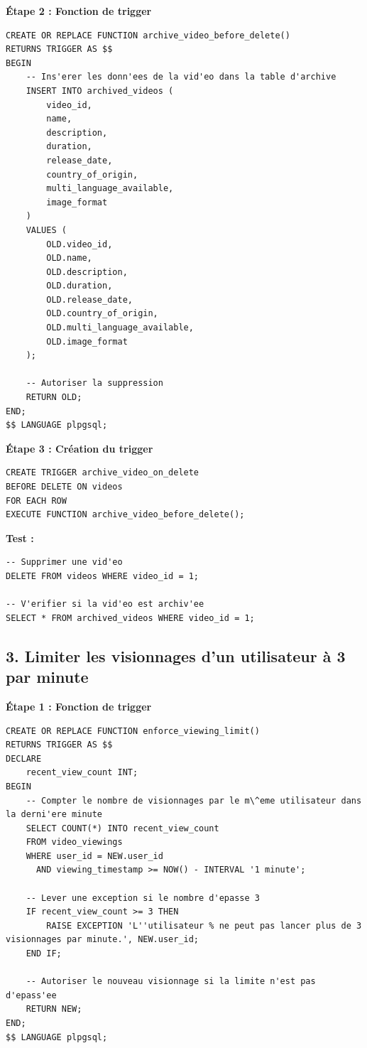 \documentclass[a4paper, 12pt]{article}
\begin{document}
\textbf{Étape 2 : Fonction de trigger}

\begin{lstlisting}
CREATE OR REPLACE FUNCTION archive_video_before_delete()
RETURNS TRIGGER AS $$
BEGIN
    -- Ins'erer les donn'ees de la vid'eo dans la table d'archive
    INSERT INTO archived_videos (
        video_id, 
        name, 
        description, 
        duration, 
        release_date, 
        country_of_origin, 
        multi_language_available, 
        image_format
    )
    VALUES (
        OLD.video_id,
        OLD.name,
        OLD.description,
        OLD.duration,
        OLD.release_date,
        OLD.country_of_origin,
        OLD.multi_language_available,
        OLD.image_format
    );

    -- Autoriser la suppression
    RETURN OLD;
END;
$$ LANGUAGE plpgsql;
\end{lstlisting}

\textbf{Étape 3 : Création du trigger}

\begin{lstlisting}
CREATE TRIGGER archive_video_on_delete
BEFORE DELETE ON videos
FOR EACH ROW
EXECUTE FUNCTION archive_video_before_delete();
\end{lstlisting}

\textbf{Test :}

\begin{lstlisting}
-- Supprimer une vid'eo
DELETE FROM videos WHERE video_id = 1;

-- V'erifier si la vid'eo est archiv'ee
SELECT * FROM archived_videos WHERE video_id = 1;
\end{lstlisting}

\subsection*{3. Limiter les visionnages d'un utilisateur à 3 par minute}

\textbf{Étape 1 : Fonction de trigger}

\begin{lstlisting}
CREATE OR REPLACE FUNCTION enforce_viewing_limit()
RETURNS TRIGGER AS $$
DECLARE
    recent_view_count INT;
BEGIN
    -- Compter le nombre de visionnages par le m\^eme utilisateur dans la derni'ere minute
    SELECT COUNT(*) INTO recent_view_count
    FROM video_viewings
    WHERE user_id = NEW.user_id
      AND viewing_timestamp >= NOW() - INTERVAL '1 minute';

    -- Lever une exception si le nombre d'epasse 3
    IF recent_view_count >= 3 THEN
        RAISE EXCEPTION 'L''utilisateur % ne peut pas lancer plus de 3 visionnages par minute.', NEW.user_id;
    END IF;

    -- Autoriser le nouveau visionnage si la limite n'est pas d'epass'ee
    RETURN NEW;
END;
$$ LANGUAGE plpgsql;
\end{lstlisting}
\end{document}
